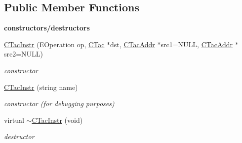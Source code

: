 \subsection*{Public Member Functions}
\begin{Indent}{\bf constructors/destructors}\par
\begin{DoxyCompactItemize}
\item 
\hyperlink{classCTacInstr_ab62b576119f83c7472d9f1ab5c8a3c55}{C\-Tac\-Instr} (E\-Operation op, \hyperlink{classCTac}{C\-Tac} $\ast$dst, \hyperlink{classCTacAddr}{C\-Tac\-Addr} $\ast$src1=N\-U\-L\-L, \hyperlink{classCTacAddr}{C\-Tac\-Addr} $\ast$src2=N\-U\-L\-L)
\begin{DoxyCompactList}\small\item\em constructor \end{DoxyCompactList}\item 
\hyperlink{classCTacInstr_ad0587d8fc93e0c439607fdc05df6235f}{C\-Tac\-Instr} (string name)
\begin{DoxyCompactList}\small\item\em constructor (for debugging purposes) \end{DoxyCompactList}\item 
\hypertarget{classCTacInstr_a6892203fd91d2451bf9f593acb343d78}{virtual \hyperlink{classCTacInstr_a6892203fd91d2451bf9f593acb343d78}{$\sim$\-C\-Tac\-Instr} (void)}\label{classCTacInstr_a6892203fd91d2451bf9f593acb343d78}

\begin{DoxyCompactList}\small\item\em destructor \end{DoxyCompactList}\end{DoxyCompactItemize}
\end{Indent}

